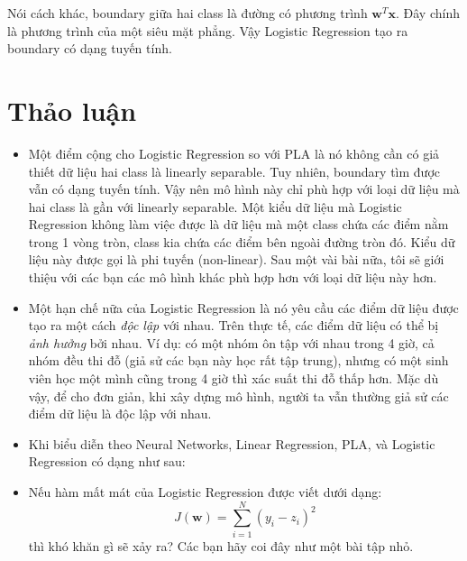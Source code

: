{ 
Nói cách khác, boundary giữa hai class là đường có phương trình $\mathbf{w}^T\mathbf{x}$. Đây chính là phương trình của một siêu mặt phẳng. Vậy Logistic Regression tạo ra boundary có dạng tuyến tính. 
 
 
\section{Thảo luận }
\begin{itemize}
    \item Một điểm cộng cho Logistic Regression so với PLA là nó không cần có giả thiết dữ liệu hai class là linearly separable. Tuy nhiên, boundary tìm được vẫn có dạng tuyến tính. Vậy nên mô hình này chỉ phù hợp với loại dữ liệu mà hai class là gần với linearly separable. Một kiểu dữ liệu mà Logistic Regression không làm việc được là dữ liệu mà một class chứa các điểm nằm trong 1 vòng tròn, class kia chứa các điểm bên ngoài đường tròn đó. Kiểu dữ liệu này được gọi là phi tuyến (non-linear). Sau một vài bài nữa, tôi sẽ giới thiệu với các bạn các mô hình khác phù hợp hơn với loại dữ liệu này hơn.  

    \item Một hạn chế nữa của Logistic Regression là nó yêu cầu các điểm dữ liệu được tạo ra một cách \textit{độc lập} với nhau. Trên thực tế, các điểm dữ liệu có thể bị \textit{ảnh hưởng} bởi nhau. Ví dụ: có một nhóm ôn tập với nhau trong 4 giờ, cả nhóm đều thi đỗ (giả sử các bạn này học rất tập trung), nhưng có một sinh viên học một mình cũng trong 4 giờ thì xác suất thi đỗ thấp hơn. Mặc dù vậy, để cho đơn giản, khi xây dựng mô hình, người ta vẫn thường giả sử các điểm dữ liệu là độc lập với nhau.  

    \item Khi biểu diễn theo Neural Networks, Linear Regression, PLA, và Logistic Regression có dạng như sau: 
    
    \item Nếu hàm mất mát của Logistic Regression được viết dưới dạng: 
        \begin{equation*} 
        J(\mathbf{w}) = \sum_{i=1}^N (y_i - z_i)^2 
        \end{equation*} 
        thì khó khăn gì sẽ xảy ra? Các bạn hãy coi đây như một bài tập nhỏ.  
    

\end{itemize}}
